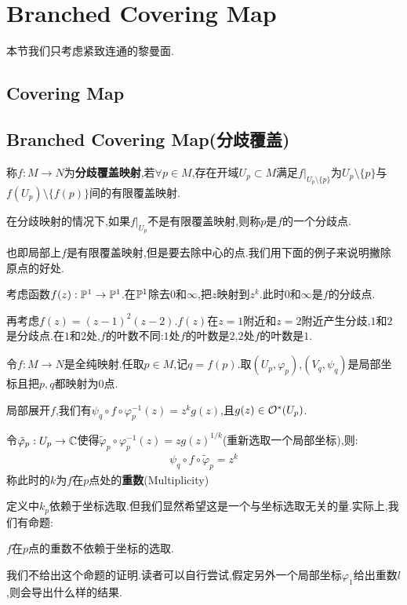 \section{Branched Covering Map}
本节我们只考虑紧致连通的黎曼面.
\subsection*{Covering Map}
\subsection*{Branched Covering Map(分歧覆盖)}
\begin{definition}
	称$f:M \to N$为\textbf{分歧覆盖映射},若$\forall p \in M$,存在开域$U_p \subset M$满足$f|_{U_p\setminus \{p\}}$为$U_p\setminus \{p\}$与$f(U_p)\setminus\{f(p)\}$间的有限覆盖映射.

	在分歧映射的情况下,如果$f|_{U_p}$不是有限覆盖映射,则称$p$是$f$的一个分歧点.
	
\end{definition}
也即局部上$f$是有限覆盖映射,但是要去除中心的点.我们用下面的例子来说明撇除原点的好处.
\begin{example}
	考虑函数$f(z):\mathbb{P}^1 \to \mathbb{P}^1$.在$\mathbb{P}^1$除去$0$和$\infty$,把$z$映射到$z^k$.此时$0$和$\infty$是$f$的分歧点.
	
	再考虑$f(z)=(z-1)^2(z-2)$.$f(z)$在$z=1$附近和$z=2$附近产生分歧,$1$和$2$是分歧点.在$1$和$2$处,$f$的叶数不同:$1$处$f$的叶数是$2$,$2$处$f$的叶数是$1$.
\end{example}
\begin{definition}[重数Multiplicity]
	令$f:M \to N$是全纯映射.任取$p \in M$,记$q=f(p)$.取$(U_p,\varphi_p)$,$(V_q,\psi_q)$是局部坐标且把$p,q$都映射为$0$点.

	局部展开$f$,我们有$\psi_q \circ f \circ \varphi_p^{-1}(z)=z^k g(z)$,且$g(z) \in \mathcal{O}^*(U_p)$.

	令$\tilde{\varphi}_p:U_p\to \mathbb{C}$使得$\tilde{\varphi}_p \circ \varphi_p^{-1}(z)=z g(z)^{1/k}$(重新选取一个局部坐标),则:
	\begin{align*}
		\psi_q \circ f \circ \tilde{\varphi}_p=z^k
	\end{align*}
	称此时的$k$为$f$在$p$点处的\textbf{重数}(Multiplicity)
\end{definition}
定义中$k_p$依赖于坐标选取.但我们显然希望这是一个与坐标选取无关的量.实际上,我们有命题:
\begin{proposition}
	$f$在$p$点的重数不依赖于坐标的选取.
\end{proposition}
我们不给出这个命题的证明.读者可以自行尝试,假定另外一个局部坐标$\varphi_1$给出重数$l$,则会导出什么样的结果.

